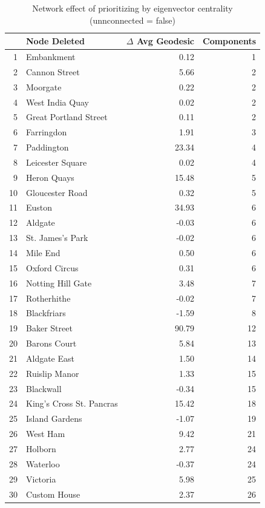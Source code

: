 \documentclass[11pt]{article} %
\begin{document}

\begin{table}[htbp]
\centering
\begin{tabular}{|r|l|r|r|}
\hline
\multicolumn{1}{|l|}{} & Node Deleted & \multicolumn{1}{l|}{$\Delta$ Avg Geodesic} & \multicolumn{1}{l|}{Components} \\ \hline
1 & Embankment & 0.12 & 1 \\ 
2 & Cannon Street & 5.66 & 2 \\ 
3 & Moorgate & 0.22 & 2 \\ 
4 & West India Quay & 0.02 & 2 \\ 
5 & Great Portland Street & 0.11 & 2 \\ 
6 & Farringdon & 1.91 & 3 \\ 
7 & Paddington & 23.34 & 4 \\ 
8 & Leicester Square & 0.02 & 4 \\ 
9 & Heron Quays & 15.48 & 5 \\ 
10 & Gloucester Road & 0.32 & 5 \\ 
11 & Euston & 34.93 & 6 \\ 
12 & Aldgate & -0.03 & 6 \\ 
13 & St. James's Park & -0.02 & 6 \\ 
14 & Mile End & 0.50 & 6 \\ 
15 & Oxford Circus & 0.31 & 6 \\ 
16 & Notting Hill Gate & 3.48 & 7 \\ 
17 & Rotherhithe & -0.02 & 7 \\ 
18 & Blackfriars & -1.59 & 8 \\ 
19 & Baker Street & 90.79 & 12 \\ 
20 & Barons Court & 5.84 & 13 \\ 
21 & Aldgate East & 1.50 & 14 \\ 
22 & Ruislip Manor & 1.33 & 15 \\ 
23 & Blackwall & -0.34 & 15 \\ 
24 & King's Cross St. Pancras & 15.42 & 18 \\ 
25 & Island Gardens & -1.07 & 19 \\ 
26 & West Ham & 9.42 & 21 \\ 
27 & Holborn & 2.77 & 24 \\ 
28 & Waterloo & -0.37 & 24 \\ 
29 & Victoria & 5.98 & 25 \\ 
30 & Custom House & 2.37 & 26 \\ \hline
\end{tabular}
\caption{Network effect of prioritizing  by eigenvector centrality \\ (unnconnected = false)}
\label{eig true}
\end{table}
\end{document}
